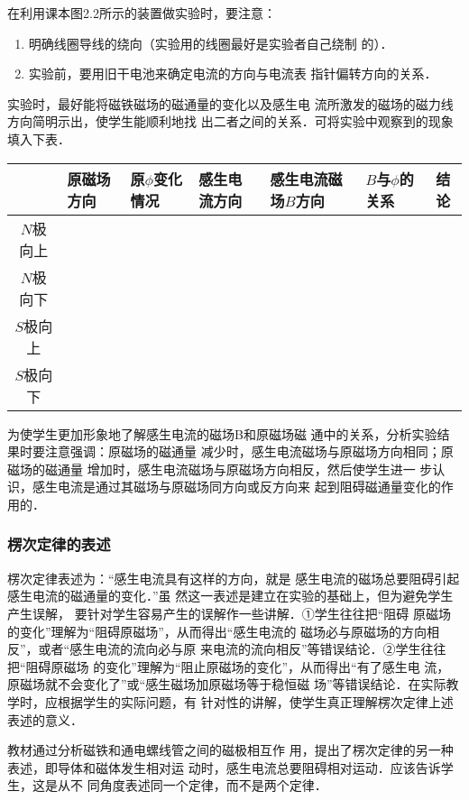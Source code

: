 在利用课本图2.2所示的装置做实验时，要注意：
\begin{enumerate}
\item 
明确线圈导线的绕向（实验用的线圈最好是实验者自己绕制
的）．   
 \item 实验前，要用旧干电池来确定电流的方向与电流表
指针偏转方向的关系．
\end{enumerate}

实验时，最好能将磁铁磁场的磁通量的变化以及感生电
流所激发的磁场的磁力线方向简明示出，使学生能顺利地找
出二者之间的关系．可将实验中观察到的现象填入下表．
\begin{center}
\begin{tabular}{c|p{}p{}p{}p{}p{}c}
    \hline
   & 原磁场方向  & 原$\phi$变化情况& 感生电流方向& 感生电流磁场$B$方向& $B$与$\phi$的关系& 结论\\
   \hline
   $N$极向上\\
   $N$极向下\\
   $S$极向上\\
   $S$极向下\\
   \hline
\end{tabular}
\end{center}

为使学生更加形象地了解感生电流的磁场B和原磁场磁
通中的关系，分析实验结果时要注意强调：原磁场的磁通量
减少时，感生电流磁场与原磁场方向相同；原磁场的磁通量
增加时，感生电流磁场与原磁场方向相反，然后使学生进一
步认识，感生电流是通过其磁场与原磁场同方向或反方向来
起到阻碍磁通量变化的作用的．

\subsubsection{楞次定律的表述}

楞次定律表述为：“感生电流具有这样的方向，就是
感生电流的磁场总要阻碍引起感生电流的磁通量的变化．”虽
然这一表述是建立在实验的基础上，但为避免学生产生误解，
要针对学生容易产生的误解作一些讲解．①学生往往把“阻碍
原磁场的变化”理解为“阻碍原磁场”，从而得出“感生电流的
磁场必与原磁场的方向相反”，或者“感生电流的流向必与原
来电流的流向相反”等错误结论．②学生往往把“阻碍原磁场
的变化”理解为“阻止原磁场的变化”，从而得出“有了感生电
流，原磁场就不会变化了”或“感生磁场加原磁场等于稳恒磁
场”等错误结论．在实际教学时，应根据学生的实际问题，有
针对性的讲解，使学生真正理解楞次定律上述表述的意义．

教材通过分析磁铁和通电螺线管之间的磁极相互作
用，提出了楞次定律的另一种表述，即导体和磁体发生相对运
动时，感生电流总要阻碍相对运动．应该告诉学生，这是从不
同角度表述同一个定律，而不是两个定律．

